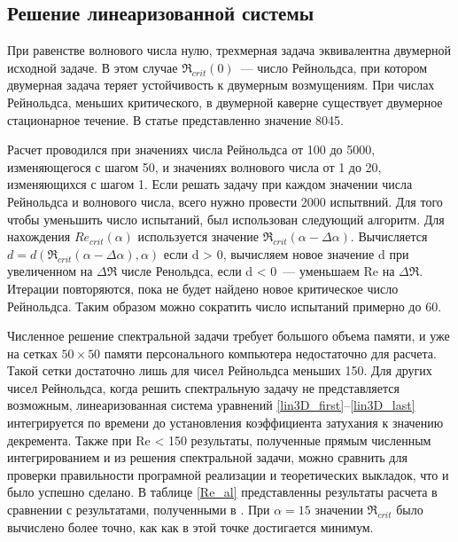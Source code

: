 \subsection{Решение линеаризованной системы} 
При равенстве волнового числа нулю, трехмерная задача эквивалентна двумерной исходной задаче. В этом случае $\Re_{crit}(0)$~--- число Рейнольдса, при котором двумерная задача теряет устойчивость к двумерным возмущениям. При числах Рейнольдса, меньших критического, в двумерной каверне существует двумерное стационарное течение. В статье \cite{lin-stability} представленно значение 8045.  
\fi


Расчет проводился при значениях числа Рейнольдса от 100 до 5000, изменяющегося с шагом 50, и значениях волнового числа от 1 до 20, изменяющихся с шагом 1. Если решать задачу при каждом значении числа Рейнольдса и волнового числа, всего нужно провести 2000 испытвний. Для того чтобы уменьшить число испытаний, был использован следующий алгоритм. Для нахождения $Re_{crit}(\alpha)$ используется значение $\Re_{crit}(\alpha - \Delta\alpha)$. Вычисляется $d = d(\Re_{crit}(\alpha - \Delta\alpha), \alpha)$ если d > 0, вычисляем новое значение d при увеличенном на $\Delta \Re$ числе Ренольдса, если d < 0~--- уменьшаем Re на $\Delta \Re$. Итерации повторяются, пока не будет найдено новое критическое число Рейнольдса. 
Таким образом можно сократить число испытаний примерно до 60. 

Численное решение спектральной задачи требует большого объема памяти, и уже на сетках $50 \times 50$ памяти персонального компьютера недостаточно для расчета. Такой сетки достаточно лишь для чисел Рейнольдса меньших 150. Для других чисел Рейнольдса, когда решить спектральную задачу не представляется возможным, линеаризованная система уравнений \ref{lin3D_first}--\ref{lin3D_last} интегрируется по времени до установления коэффициента затухания к значению декремента. Также при Re < 150 результаты, полученные прямым численным интегрированием и из решения спектральной задачи, можно сравнить для проверки правильности програмной реализации и теоретических выкладок, что и было успешно сделано. 
В таблице \ref{Re_al} представленны результаты расчета в сравнении с результатами, полученными в \cite{lin-stability}. При $\alpha = 15$ значении $\Re_{crit}$ было вычислено более точно, как как в этой точке достигается минимум.

